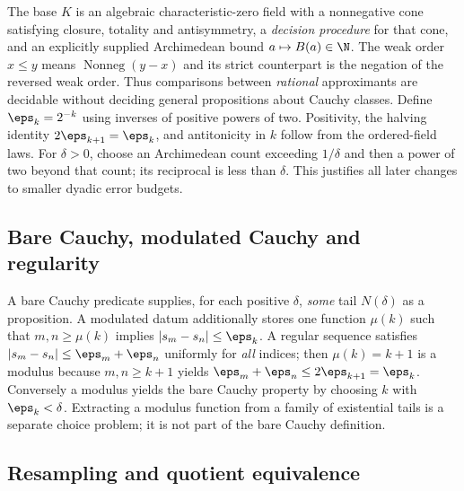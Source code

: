 The base $K$ is an algebraic characteristic-zero field with a nonnegative cone satisfying closure, totality and antisymmetry, a \emph{decision procedure} for that cone, and an explicitly supplied Archimedean bound $a\mapsto B(a)\in\N$. The weak order $x\le y$ means $\operatorname{Nonneg}(y-x)$ and its strict counterpart is the negation of the reversed weak order. Thus comparisons between \emph{rational} approximants are decidable without deciding general propositions about Cauchy classes. Define $\eps_k=2^{-k}$ using inverses of positive powers of two. Positivity, the halving identity $2\eps_{k+1}=\eps_k$, and antitonicity in $k$ follow from the ordered-field laws. For $\delta>0$, choose an Archimedean count exceeding $1/\delta$ and then a power of two beyond that count; its reciprocal is less than $\delta$. This justifies all later changes to smaller dyadic error budgets.

\subsection{Bare Cauchy, modulated Cauchy and regularity}\label{supp:12-2}
\par{}\par\smallskip

A bare Cauchy predicate supplies, for each positive $\delta$, \emph{some} tail $N(\delta)$ as a proposition. A modulated datum additionally stores one function $\mu(k)$ such that $m,n\ge\mu(k)$ implies $|s_m-s_n|\le\eps_k$. A regular sequence satisfies $|s_m-s_n|\le\eps_m+\eps_n$ uniformly for \emph{all} indices; then $\mu(k)=k+1$ is a modulus because $m,n\ge k+1$ yields $\eps_m+\eps_n\le2\eps_{k+1}=\eps_k$. Conversely a modulus yields the bare Cauchy property by choosing $k$ with $\eps_k<\delta$. Extracting a modulus function from a family of existential tails is a separate choice problem; it is not part of the bare Cauchy definition.

\subsection{Resampling and quotient equivalence}\label{supp:12-3}
\par{}\par\smallskip

